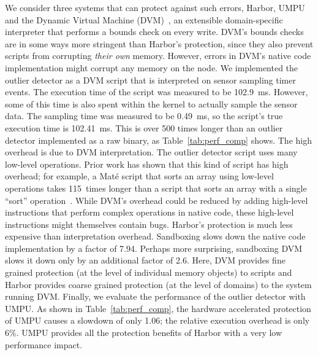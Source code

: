 We consider three systems that can protect against such errors,
%
Harbor, UMPU and the Dynamic Virtual Machine (DVM)~\cite{balani06dvm}, an extensible
domain-specific interpreter that performs a bounds check on every write.
%
DVM's bounds checks are in some ways more stringent than Harbor's
protection, since they also prevent scripts from corrupting \emph{their
own} memory.  However, errors in DVM's native code implementation might
corrupt any memory on the node.
%
We implemented the outlier detector as a DVM script that is interpreted on
sensor sampling timer events.
%
The execution time of the script was measured to be 102.9~ms.
%
However, some of this time is also spent within the kernel to actually sample the sensor data.
%
The sampling time was measured to be 0.49~ms, so
%
the script's true execution time is 102.41~ms.
%
This is over 500 times longer than an outlier detector implemented as a raw
binary, as Table~\ref{tab:perf_comp} shows.
%
The high overhead is due to DVM interpretation.
%
The outlier detector script uses many low-level operations.
%
Prior work has shown that this kind of script has high overhead; for
example, a Mat\'e script that sorts an array using low-level
operations takes 115~times longer than a script that sorts an array
with a single ``sort'' operation~\cite{asvm05nsdi}.
%
While DVM's overhead could be reduced by adding high-level
instructions that perform complex operations in native code, these
high-level instructions might themselves contain bugs.
%
Harbor's protection is much less expensive than interpretation overhead.
%
Sandboxing slows down the native code implementation by a factor of 7.94.
%
Perhaps more surprising, sandboxing DVM slows it down only by an
additional factor of 2.6.
%
%
Here, DVM provides fine grained protection (at the level of individual
memory objects) to scripts and Harbor provides coarse grained protection
(at the level of domains) to the system running DVM.
%
Finally, we evaluate the performance of the outlier detector with
UMPU.
%
As shown in Table~\ref{tab:perf_comp}, the hardware accelerated
protection of UMPU causes a slowdown of only 1.06; the relative
execution overhead is only 6\%.
%
UMPU provides all the protection benefits of Harbor with a very low
performance impact.
%
%
%

